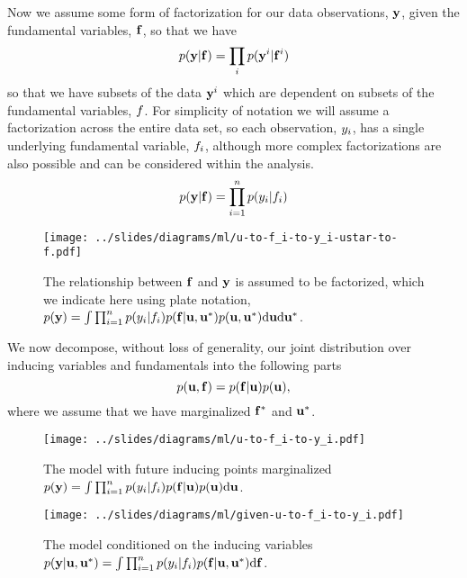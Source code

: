 \documentclass[a4paperpaper,]{article}
\begin{document}
Now we assume some form of factorization for our data observations,
\(\mathbf{ y}\), given the fundamental variables,
\(\mathbf{ f}\), so that we have \[
p(\mathbf{ y}|\mathbf{ f}) = \prod_{i} p(\mathbf{ y}^i| \mathbf{ f}^i)
\] so that we have subsets of the data \(\mathbf{ y}^i\) which are
dependent on subsets of the fundamental variables, \(f\).
For simplicity of notation we will assume a factorization across the
entire data set, so each observation, \(y_i\), has a single
underlying fundamental variable, \(f_i\), although more
complex factorizations are also possible and can be considered within
the analysis. \[
p(\mathbf{ y}|\mathbf{ f}) = \prod_{i=1}^n p(y_i|f_i)
\]

\begin{figure}[htb]
\texttt{[image: ../slides/diagrams/ml/u-to-f\_i-to-y\_i-ustar-to-f.pdf]}


\caption{The relationship between $\mathbf{ f}$ and $\mathbf{ y}$ is assumed to be factorized, which we indicate here using plate notation, $p(\mathbf{ y}) = \int \prod_{i=1}^n p(y_i|f_i) p(\mathbf{ f} | \mathbf{ u}, \mathbf{ u}^*) p(\mathbf{ u}, \mathbf{ u}^*)\text{d}\mathbf{ u} \text{d}\mathbf{ u}^*$.}
\label{u-to-f_i-to-y_i-ustar-to-f}
\end{figure}

We now decompose, without loss of generality, our joint distribution
over inducing variables and fundamentals into the following parts \[
p(\mathbf{ u}, \mathbf{ f}) = p(\mathbf{ f}|\mathbf{ u})p(\mathbf{ u}),
\] where we assume that we have marginalized
\(\mathbf{ f}^*\) and \(\mathbf{ u}^*\).



\begin{figure}[htb]
\texttt{[image: ../slides/diagrams/ml/u-to-f\_i-to-y\_i.pdf]}


\caption{The model with future inducing points marginalized $p(\mathbf{ y}) = \int \prod_{i=1}^n p(y_i|f_i) p(\mathbf{ f} | \mathbf{ u}) p(\mathbf{ u})\text{d}\mathbf{ u}$.}
\label{u-to-f_i-to-y_i}
\end{figure}



\begin{figure}[htb]
\texttt{[image: ../slides/diagrams/ml/given-u-to-f\_i-to-y\_i.pdf]}


\caption{The model conditioned on the inducing variables $p(\mathbf{ y}|\mathbf{ u}, \mathbf{ u}^*) = \int\prod_{i=1}^n p(y_i|f_i) p(\mathbf{ f}|\mathbf{ u}, \mathbf{ u}^*)\text{d}\mathbf{ f}$.}
\label{given-u-to-f_i-to-y_i}
\end{figure}
\end{document}
